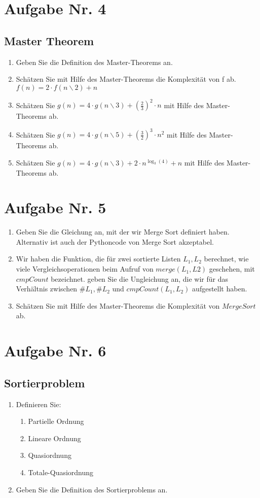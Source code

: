 \documentclass[12px,a4paper]{article}
\begin{document}
\section*{Aufgabe Nr. 4}
\subsection*{Master Theorem}
\begin{enumerate}
	\item Geben Sie die Definition des Master-Theorems an.
	\item Schätzen Sie mit Hilfe des Master-Theorems die Komplexität von f ab. \\
	\noindent\hspace*{0.5mm} $f(n) = 2 \cdot f(n\backslash 2) + n$
	\item Schätzen Sie $g(n) = 4 \cdot g(n\backslash 3) + ( \frac{2}{3} ) ^2 \cdot n$ mit Hilfe des Master-Theorems ab.
	\item Schätzen Sie $g(n) = 4 \cdot g(n\backslash 5) + ( \frac{3}{2} ) ^3 \cdot n^2$ mit Hilfe des Master-Theorems ab.
	\item Schätzen Sie $g(n) = 4 \cdot g(n\backslash 3) + 2 \cdot n^{\log_3(4)} + n$ mit Hilfe des Master-Theorems ab.
\end{enumerate}
\newpage
\section*{Aufgabe Nr. 5}
\begin{enumerate}
	\item Geben Sie die Gleichung an, mit der wir Merge Sort definiert haben. Alternativ ist auch der Pythoncode von Merge Sort akzeptabel.
	\item Wir haben die Funktion, die für zwei sortierte Listen $L_1, L_2$ berechnet, wie viele Vergleichsoperationen beim Aufruf von $merge(L_1, L2)$ geschehen, mit $cmpCount$ bezeichnet. geben Sie die Ungleichung an, die wir für das Verhältnis zwischen $\#L_1, \#L_2$ und $cmpCount(L_1, L_2)$ aufgestellt haben. 
	\item Schätzen Sie mit Hilfe des Master-Theorems die Komplexität von $Merge Sort$ ab.
\end{enumerate}
\newpage
\section*{Aufgabe Nr. 6}
\subsection*{Sortierproblem}
\begin{enumerate}
	\item Definieren Sie:	
	\begin{enumerate} 
	\item Partielle Ordnung
	\item Lineare Ordnung
	\item Quasiordnung
	\item Totale-Quasiordnung
	\end{enumerate}
	
	\item Geben Sie die Definition des Sortierproblems an.
\end{enumerate}
\newpage
\end{document}
